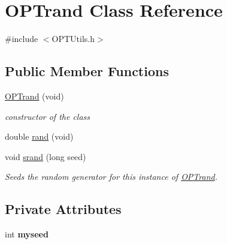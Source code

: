 \hypertarget{class_o_p_ttypes__di__unipi__it_1_1_o_p_trand}{}\section{O\+P\+Trand Class Reference}
\label{class_o_p_ttypes__di__unipi__it_1_1_o_p_trand}


{\ttfamily \#include $<$O\+P\+T\+Utils.\+h$>$}

\subsection*{Public Member Functions}
\begin{DoxyCompactItemize}
\item 
\mbox{\label{class_o_p_ttypes__di__unipi__it_1_1_o_p_trand_a1072daef6b56695678f5ebb5096e7953}} 
\mbox{\hyperlink{class_o_p_ttypes__di__unipi__it_1_1_o_p_trand_a1072daef6b56695678f5ebb5096e7953}{O\+P\+Trand}} (void)
\begin{DoxyCompactList}\small\item\em constructor of the class \end{DoxyCompactList}\item 
double \mbox{\hyperlink{class_o_p_ttypes__di__unipi__it_1_1_o_p_trand_afb2af72eb05fcf452da2d1c3a2e0b426}{rand}} (void)
\item 
\mbox{\label{class_o_p_ttypes__di__unipi__it_1_1_o_p_trand_ac35b0f656fed40605c1c8ceda412f185}} 
void \mbox{\hyperlink{class_o_p_ttypes__di__unipi__it_1_1_o_p_trand_ac35b0f656fed40605c1c8ceda412f185}{srand}} (long seed)
\begin{DoxyCompactList}\small\item\em Seeds the random generator for this instance of \mbox{\hyperlink{class_o_p_ttypes__di__unipi__it_1_1_o_p_trand}{O\+P\+Trand}}. \end{DoxyCompactList}\end{DoxyCompactItemize}
\subsection*{Private Attributes}
\begin{DoxyCompactItemize}
\item 
\mbox{\label{class_o_p_ttypes__di__unipi__it_1_1_o_p_trand_aa1cd4fd53188f67a2e2089adbf9ff67b}} 
int {\bfseries myseed}
\end{DoxyCompactItemize}


